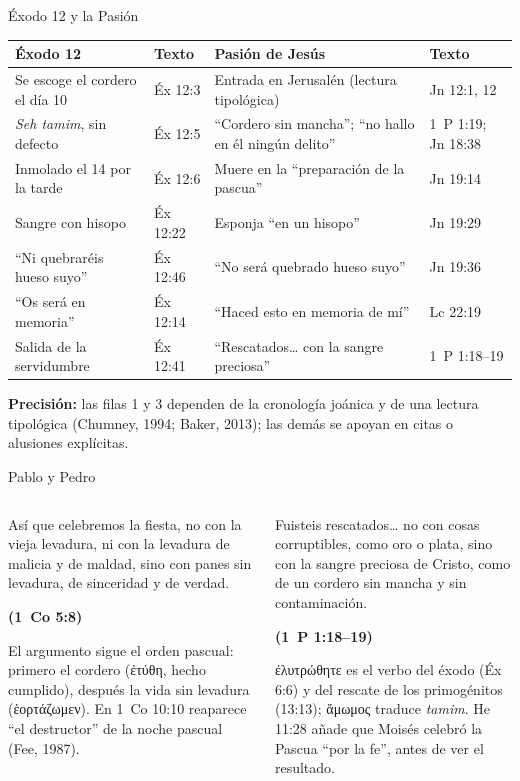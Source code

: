 \documentclass[hyperref={bookmarks=false},aspectratio=169]{beamer}
\newcommand{\grc}[1]{\foreignlanguage{ancientgreek}{#1}}
\newcommand{\fuente}[1]{\par\hfill{\upshape\bfseries\footnotesize\textcolor{tierraroja}{#1}}}
\newcommand{\precision}[1]{{\footnotesize\color{sepia}\textbf{Precisión:} #1}}
\begin{document}
\begin{frame}{Éxodo 12 y la Pasión}
\scriptsize\renewcommand{\arraystretch}{1.12}
\begin{tabular}{@{}L{3.4cm}L{1.5cm}L{4.8cm}L{1.9cm}@{}}
\toprule
\textbf{Éxodo 12} & \textbf{Texto} & \textbf{Pasión de Jesús} & \textbf{Texto} \\ \midrule
Se escoge el cordero el día 10 & Éx 12:3 & Entrada en Jerusalén (lectura tipológica) & Jn 12:1, 12 \\
\emph{Seh tamim}, sin defecto & Éx 12:5 & ``Cordero sin mancha''; ``no hallo en él ningún delito'' & 1~P 1:19; Jn 18:38 \\
Inmolado el 14 por la tarde & Éx 12:6 & Muere en la ``preparación de la pascua'' & Jn 19:14 \\
Sangre con hisopo & Éx 12:22 & Esponja ``en un hisopo'' & Jn 19:29 \\
``Ni quebraréis hueso suyo'' & Éx 12:46 & ``No será quebrado hueso suyo'' & Jn 19:36 \\
``Os será en memoria'' & Éx 12:14 & ``Haced esto en memoria de mí'' & Lc 22:19 \\
Salida de la servidumbre & Éx 12:41 & ``Rescatados\ldots{} con la sangre preciosa'' & 1~P 1:18--19 \\
\bottomrule
\end{tabular}\par\smallskip
\precision{las filas 1 y 3 dependen de la cronología joánica y de una lectura tipológica (Chumney, 1994; Baker, 2013); las demás se apoyan en citas o alusiones explícitas.}
\end{frame}

\begin{frame}{Pablo y Pedro}
\begin{columns}[t,onlytextwidth]
\begin{column}{0.50\textwidth}
\begin{cita}Así que celebremos la fiesta, no con la vieja levadura, ni con la levadura de malicia y de maldad, sino con panes sin levadura, de sinceridad y de verdad.\fuente{(1~Co 5:8)}\end{cita}
\scriptsize\RaggedRight El argumento sigue el orden pascual: primero el cordero (\grc{ἐτύθη}, hecho cumplido), después la vida sin levadura (\grc{ἑορτάζωμεν}). En 1~Co 10:10 reaparece ``el destructor'' de la noche pascual (Fee, 1987).
\end{column}
\begin{column}{0.48\textwidth}
\begin{cita}Fuisteis rescatados\ldots{} no con cosas corruptibles, como oro o plata, sino con la sangre preciosa de Cristo, como de un cordero sin mancha y sin contaminación.\fuente{(1~P 1:18--19)}\end{cita}
\scriptsize\RaggedRight \grc{ἐλυτρώθητε} es el verbo del éxodo (Éx 6:6) y del rescate de los primogénitos (13:13); \grc{ἄμωμος} traduce \emph{tamim}. He 11:28 añade que Moisés celebró la Pascua ``por la fe'', antes de ver el resultado.
\end{column}
\end{columns}
\end{frame}
\end{document}
